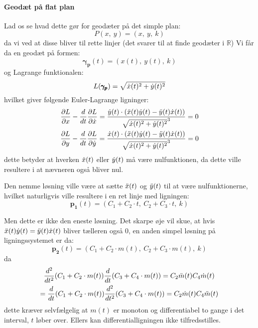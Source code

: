 \paragraph{Geodæt på flat plan}
Lad os se hvad dette gør for geodæter på det simple plan:
\begin{equation}\label{eq:P}
P(x,~y) = (x,~y,~k)
\end{equation}
da vi ved at disse bliver til rette linjer (det svarer til at finde geodæter i \(\mathbb{R}\))
%
Vi får da en geodæt på formen:
\begin{equation*}
\pmb{\gamma_p}(t) = (x(t),~y(t),~k)
\end{equation*}
%
og Lagrange funktionalen:
\begin{equation*}
L(\pmb{\gamma_p}) = \sqrt{ \dot{x}(t)^2 + \dot{y}(t)^2 }
\end{equation*}
%
hvilket giver følgende Euler-Lagrange ligninger:
\begin{equation*}
\begin{gathered}
\frac{\partial L}{\partial x} - \frac{d}{d t} \frac{\partial L}{\partial \dot{x}} =
\frac{\dot{y}(t) \cdot ( \ddot{x}(t)\dot{y}(t) - \ddot{y}(t)\dot{x}(t) )}{\sqrt{\dot{x}(t)^2 + \dot{y}(t)^2}^3} = 0\\
\frac{\partial L}{\partial y} - \frac{d}{d t} \frac{\partial L}{\partial \dot{y}} =
\frac{\dot{x}(t) \cdot ( \ddot{x}(t)\dot{y}(t) - \ddot{y}(t)\dot{x}(t) )}{\sqrt{\dot{x}(t)^2 + \dot{y}(t)^2}^3} = 0\\
\end{gathered}
\end{equation*}
%
dette betyder at hverken  \( \dot{x}(t) \) eller \(\dot{y}(t) \) må være nulfunktionen,
da dette ville resultere i at nævneren også bliver nul.

Den nemme løsning ville være at sætte \(\ddot{x}(t)\) og \(\ddot{y}(t)\) til at være nulfunktionerne,
hvilket naturligvis ville resultere i en ret linje med ligningen:
\begin{equation*}
\pmb{p_1}(t) = (C_1 + C_2\cdot t,~C_2 + C_3\cdot t,~k)
\end{equation*}

Men dette er ikke den eneste løsning. Det skarpe øje vil skue, at hvis
\( \ddot{x}(t)\dot{y}(t) = \ddot{y}(t)\dot{x}(t) \)
bliver tælleren også \(0\), en anden simpel løsning på ligningssystemet er da:
\begin{equation*}
\pmb{p_2}(t) = (C_1 + C_2\cdot m(t),~C_2 + C_3\cdot m(t),~k)
\end{equation*}
da
\begin{equation*}
\begin{gathered}
\frac{d^2}{dt^2} (C_1 + C_2\cdot m(t)) \frac{d}{dt} (C_3 + C_4\cdot m(t)) = C_2\ddot{m}(t) C_4\dot{m}(t) \\
 = \frac{d}{dt} (C_1 + C_2\cdot m(t)) \frac{d^2}{dt^2} (C_3 + C_4\cdot m(t)) = C_2\dot{m}(t) C_4\ddot{m}(t) 
\end{gathered}
\end{equation*}
dette kræver selvfælgelig at \( m(t) \) er monoton og differentiabel to gange i det interval, \(t\) løber over.
Ellers kan differentialligningen ikke tilfredsstilles.

